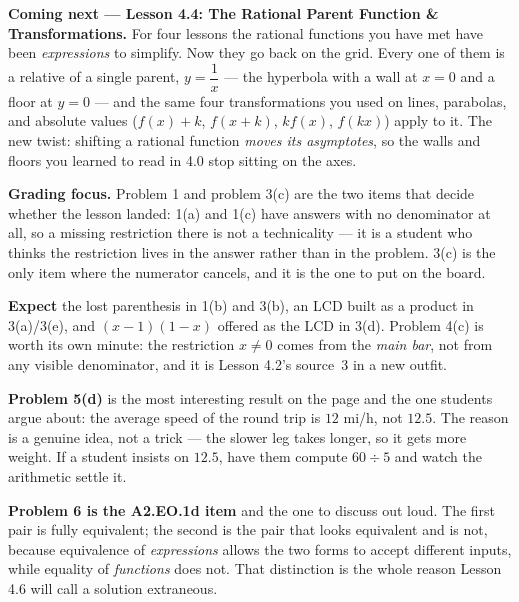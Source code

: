 \documentclass[10pt]{article}
\begin{document}
\begin{spiralbox}
\textbf{Coming next --- Lesson 4.4: The Rational Parent Function \& Transformations.} For four lessons
the rational functions you have met have been \emph{expressions} to simplify. Now they go back on the
grid. Every one of them is a relative of a single parent, $y=\dfrac{1}{x}$ --- the hyperbola with a wall
at $x=0$ and a floor at $y=0$ --- and the same four transformations you used on lines, parabolas, and
absolute values ($f(x)+k$, $f(x+k)$, $kf(x)$, $f(kx)$) apply to it. The new twist: shifting a rational
function \emph{moves its asymptotes}, so the walls and floors you learned to read in 4.0 stop sitting on
the axes.
\end{spiralbox}

\begin{teachernote}
\textbf{Grading focus.} Problem 1 and problem 3(c) are the two items that decide whether the lesson
landed: 1(a) and 1(c) have answers with no denominator at all, so a missing restriction there is not a
technicality --- it is a student who thinks the restriction lives in the answer rather than in the
problem. 3(c) is the only item where the numerator cancels, and it is the one to put on the board.

\vspace{3pt}
\textbf{Expect} the lost parenthesis in 1(b) and 3(b), an LCD built as a product in 3(a)/3(e), and
$(x-1)(1-x)$ offered as the LCD in 3(d). Problem 4(c) is worth its own minute: the restriction $x\neq0$
comes from the \emph{main bar}, not from any visible denominator, and it is Lesson 4.2's source~3 in a
new outfit.

\vspace{3pt}
\textbf{Problem 5(d)} is the most interesting result on the page and the one students argue about: the
average speed of the round trip is $12$ mi/h, not $12.5$. The reason is a genuine idea, not a trick ---
the slower leg takes longer, so it gets more weight. If a student insists on $12.5$, have them compute
$60\div5$ and watch the arithmetic settle it.

\vspace{3pt}
\textbf{Problem 6 is the A2.EO.1d item} and the one to discuss out loud. The first pair is fully
equivalent; the second is the pair that looks equivalent and is not, because equivalence of
\emph{expressions} allows the two forms to accept different inputs, while equality of \emph{functions}
does not. That distinction is the whole reason Lesson 4.6 will call a solution extraneous.
\end{teachernote}
\end{document}
